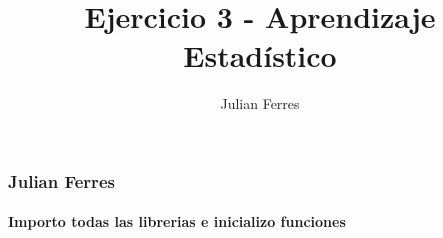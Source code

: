 \documentclass[11pt]{article}
\title{Ejercicio 3 - Aprendizaje Estad\'istico}
\author{Julian Ferres}
\begin{document}
    
    
    \maketitle
    
    

    
    \subsubsection{Julian Ferres}\label{julian-ferres}

    \paragraph{Importo todas las librerias e inicializo
funciones}\label{importo-todas-las-librerias-e-inicializo-funciones}
\end{document}
